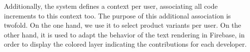 Additionally, the system defines a context per user, associating all code increments to this context too. The purpose of this additional association is twofold. On the one hand, we use it to select product variants per user. On the other hand, it is used to adapt the behavior of the text rendering in Firebase, in order to display the colored layer indicating the contributions for each developer.


\endinput
